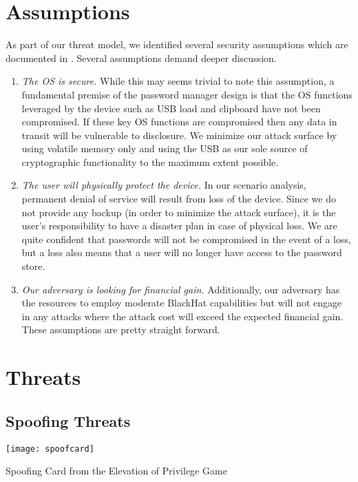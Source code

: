 \section{Assumptions}
\label{sec:assumptions}
As part of our threat model, we identified several security assumptions which
are documented in .  Several assumptions demand deeper discussion.
\begin{enumerate}
    \item{\emph{The OS is secure.} While this may seems trivial to note this
assumption, a fundamental premise of the password manager design is that the OS
functions leveraged by the device such as USB load and clipboard have not been
compromised.  If these key OS functions are compromised then any data in transit
will be vulnerable to disclosure.  We minimize our attack surface by using
volatile memory only and using the USB as our sole source of cryptographic
functionality to the maximum extent possible.}
    \item{\emph{The user will physically protect the device.} In our scenario
analysis, permanent denial of service will result from loss of the device.
Since we do not provide any backup (in order to minimize the attack surface), it
is the user's responsibility to have a disaster plan in case of physical loss.
We are quite confident that passwords will not be compromised in the event of a
loss, but a loss also means that a user will no longer have access to the
password store.}
    \item{\emph{Our adversary is looking for financial gain.} Additionally, our
adversary has the resources to employ moderate BlackHat capabilities but will
not engage in any attacks where the attack cost will exceed the expected
financial gain.}  These assumptions are pretty
straight forward.
\end{enumerate}


\section{Threats}
\label{sec:threats}

\subsection{Spoofing Threats}

\begin{marginfigure}%
\centering
  \texttt{[image: spoofcard]}
  \caption{Spoofing Card from the Elevation of Privilege Game}
  \label{fig:spoofcard}
\end{marginfigure}

